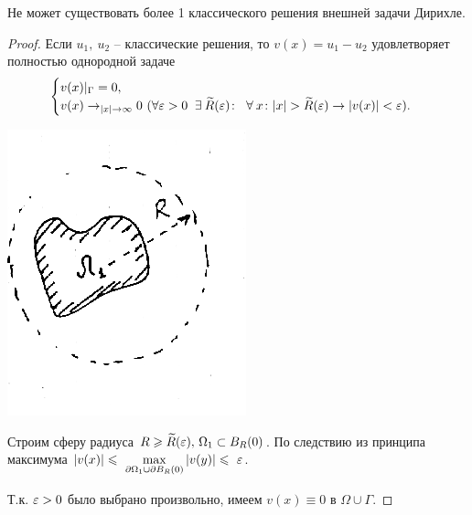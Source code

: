 \begin{theorem}
Не может существовать более 1 классического решения внешней задачи Дирихле.
\end{theorem}
\begin{proof}
Если $u_1,\  u_2$ -- классические решения, то $v(x) = u_1 - u_2$ удовлетворяет полностью однородной задаче 
\[
\begin{cases}
v(x)|_{\Gamma} = 0,\\
v(x) \rightarrow_{|x|\rightarrow \infty} 0 \ (\forall \varepsilon > 0 \;\;\exists\: \widetilde{R}(\varepsilon)\colon \;\;\forall\: x \colon |x| > \widetilde{R}(\varepsilon) \rightarrow |v(x)|<\varepsilon).
\end{cases}
\]

\begin{center}
\includegraphics[scale = 0.4]{25_1_new}
\end{center}

Строим сферу радиуса $R \geqslant \widetilde{R}(\varepsilon), \, \Omega_1 \subset B_R(0)$.
По следствию из принципа максимума $|v(x)|\leqslant~\max\limits_{\partial\Omega_1 \cup \partial B_R(0)} |v(y)|\leqslant ~\varepsilon$.

Т.к. $\varepsilon > 0$ было выбрано произвольно, имеем $v(x) \equiv 0 \text{ в } \Omega \cup \Gamma$.
\end{proof}

